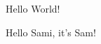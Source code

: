 \documentclass[10pt,a4paper]{article}
\begin{document}
Hello World!

Hello Sami, it's Sam! 
\end{document}

